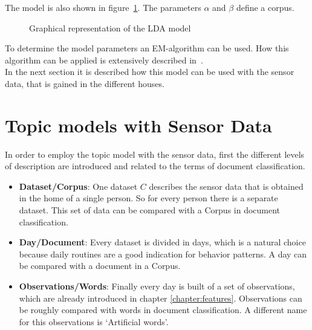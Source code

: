 The model is also shown in figure~\ref{fig:modelBasic}. The parameters $\alpha$ and $\beta$ define a corpus.

\begin{figure}[h!]
\centering
\def\svgwidth{400pt}

\caption{Graphical representation of the LDA model}
\label{fig:modelBasic}
\end{figure}

To determine the model parameters an EM-algorithm can be used. How this algorithm can be applied is extensively described in~\cite{blei2003latent}. \\
In the next section it is described how this model can be used with the sensor data, that is gained in the different houses.


\section{Topic models with Sensor Data}

In order to employ the topic model with the sensor data, first the different levels of description are introduced and related to the terms of document classification.
\begin{itemize}
 \item \textbf{Dataset/Corpus}: One dataset $C$ describes the sensor data that is obtained in the home of a single person. So for every person there is a separate dataset. This set of data can be compared with a Corpus in document classification.
 \item \textbf{Day/Document}: Every dataset is divided in days, which is a natural choice because daily routines are a good indication for behavior patterns. A day can be compared with a document in a Corpus.
 \item \textbf{Observations/Words}: Finally every day is built of a set of observations, which are already introduced in chapter \ref{chapter:features}. Observations can be roughly compared with words in document classification. A different name for this observations is  `Artificial words'.
\end{itemize}

